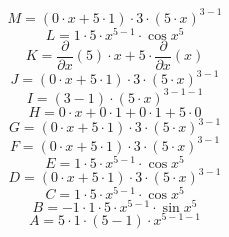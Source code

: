 \documentclass[12pt]{article}
\begin{document}
\begin{equation}
	M = 
\left( 0\cdot x + 5\cdot 1\right) \cdot 3\cdot \left( 5\cdot x\right) ^{3 - 1}
\end{equation}
\begin{equation}
	L = 
1\cdot 5\cdot x^{5 - 1}\cdot \cos {x^{5}}
\end{equation}
\begin{equation}
	K = 
\frac{\partial}{\partial x}\left( 5\right) \cdot x + 5\cdot \frac{\partial}{\partial x}\left( x\right) 
\end{equation}
\begin{equation}
	J = 
\left( 0\cdot x + 5\cdot 1\right) \cdot 3\cdot \left( 5\cdot x\right) ^{3 - 1}
\end{equation}
\begin{equation}
	I = 
\left( 3 - 1\right) \cdot \left( 5\cdot x\right) ^{3 - 1 - 1}
\end{equation}
\begin{equation}
	H = 
0\cdot x + 0\cdot 1 + 0\cdot 1 + 5\cdot 0
\end{equation}
\begin{equation}
	G = 
\left( 0\cdot x + 5\cdot 1\right) \cdot 3\cdot \left( 5\cdot x\right) ^{3 - 1}
\end{equation}
\begin{equation}
	F = 
\left( 0\cdot x + 5\cdot 1\right) \cdot 3\cdot \left( 5\cdot x\right) ^{3 - 1}
\end{equation}
\begin{equation}
	E = 
1\cdot 5\cdot x^{5 - 1}\cdot \cos {x^{5}}
\end{equation}
\begin{equation}
	D = 
\left( 0\cdot x + 5\cdot 1\right) \cdot 3\cdot \left( 5\cdot x\right) ^{3 - 1}
\end{equation}
\begin{equation}
	C = 
1\cdot 5\cdot x^{5 - 1}\cdot \cos {x^{5}}
\end{equation}
\begin{equation}
	B = 
-1\cdot 1\cdot 5\cdot x^{5 - 1}\cdot \sin {x^{5}}
\end{equation}
\begin{equation}
	A = 
5\cdot 1\cdot \left( 5 - 1\right) \cdot x^{5 - 1 - 1}
\end{equation}
\end{document}
